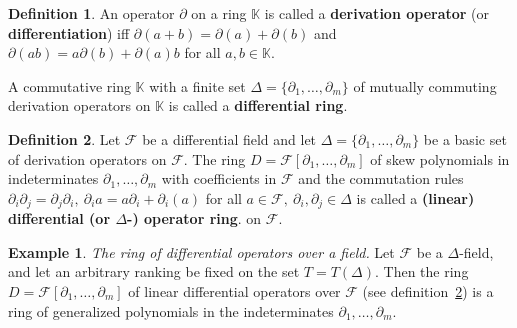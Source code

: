 \documentclass[a4paper,reqno,12pt]{amsart}
\theoremstyle{plain}
\theoremstyle{remark}
\theoremstyle{definition}
\newtheorem{example}{Example}
\newtheorem{definition}{Definition}
\newcommand{\K}{\mathbb{K}}
\def\F{\mathcal {F}}
\begin{document}
\begin{definition} An operator $\partial$ on a 
ring $\K$ is called a
{\bf derivation operator} (or {\bf differentiation}) iff 
$\partial(a+b)=\partial(a)+\partial(b)$ and $\partial(ab)=
a\partial(b)+\partial(a)b$ for all $a,b\in \K$.

A commutative ring $\K$ with a finite set 
$\Delta = \{\partial_1,\ldots,\partial_m\}$ of
mutually commuting derivation operators on $\K$ is called a 
{\bf   differential  ring}. 
\end{definition}

\begin{definition}\label{3.2.38}
Let $\F$ be a differential field and let 
$\Delta = \{\partial_1,\ldots,\partial_m\}$
 be a
basic set of derivation operators on $\F$. The ring
$D=\F[\partial_1,\ldots,\partial_m]$  of skew polynomials in indeterminates $\partial_1,\ldots,\partial_m$ 
with coefficients in $\F$ and the
commutation rules 
$\partial_i \partial_j=\partial_j \partial_i,\ \partial_i a=
a \partial_i+\partial_i(a)$
 for all
$a\in \F,\ \partial_i, \partial_j \in \Delta$
is called a {\bf (linear) differential (or $\Delta$-) operator ring}.
 on $\F$.
\end{definition}
\begin{example}\label{4.1.11}
 {\it The ring of differential operators over a field.}
Let $\F$ be a $\Delta$-field,
and let an arbitrary ranking be fixed on the set 
$T=T(\Delta)$. Then the ring
$D=\F[\partial_1,\dots,\partial_m]$
of linear differential operators over $\F$ (see
definition~\ref{3.2.38}) is a ring of generalized 
polynomials in the indeterminates $\partial_1,\dots,\partial_m$.
\end{example}
\end{document}
